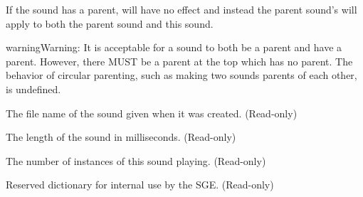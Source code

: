 \documentclass[letterpaper,10pt,english]{sphinxmanual}
\begin{document}
\begin{fulllineitems}
\begin{fulllineitems}
If the sound has a parent, {\hyperref[snd:sge.snd.Sound.max_play]{\emph{}}} will have no effect
and instead the parent sound's {\hyperref[snd:sge.snd.Sound.max_play]{\emph{}}} will apply to
both the parent sound and this sound.

\begin{notice}{warning}{Warning:}
It is acceptable for a sound to both be a parent and have a
parent.  However, there MUST be a parent at the top which has
no parent.  The behavior of circular parenting, such as making
two sounds parents of each other, is undefined.
\end{notice}

\end{fulllineitems}


\begin{fulllineitems}
\label{snd:sge.snd.Sound.fname}
The file name of the sound given when it was created.
(Read-only)

\end{fulllineitems}


\begin{fulllineitems}
\label{snd:sge.snd.Sound.length}
The length of the sound in milliseconds.  (Read-only)

\end{fulllineitems}


\begin{fulllineitems}
\label{snd:sge.snd.Sound.playing}
The number of instances of this sound playing.  (Read-only)

\end{fulllineitems}


\begin{fulllineitems}
\label{snd:sge.snd.Sound.rd}
Reserved dictionary for internal use by the SGE.  (Read-only)

\end{fulllineitems}


\end{fulllineitems}
\end{document}
